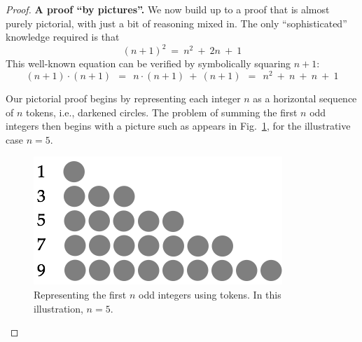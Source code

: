 \begin{proof}
{\bf A proof ``by pictures''.}
%
We now build up to a proof that is almost purely pictorial, with just
a bit of reasoning mixed in.  The only ``sophisticated'' knowledge
required is that
\begin{equation}
\label{eq:(n+1)^2}
(n+1)^2 \ = \ n^2 \ + \ 2n \ + \ 1
\end{equation}
This well-known equation can be verified by symbolically squaring $n+1$:
\[ (n+1) \cdot (n+1) \ \ = \ \ n \cdot (n+1) \ + \ (n+1) 
     \ \ = \ \ n^2 \ + \ n \ + \ n \ + \ 1
\]

\medskip

\noindent {}

\bigskip

\noindent
%
Our pictorial proof begins by representing each integer $n$ as a
horizontal sequence of $n$ tokens, i.e., darkened circles.  The
problem of summing the first $n$ odd integers then begins with a
picture such as appears in Fig.~\ref{fig:sumOdds1}, for the
illustrative case $n=5$.
\begin{figure}[ht]
\begin{center}
       \includegraphics[scale=0.4]{FiguresMaths/SumOddsBasis}
\caption{Representing the first $n$ odd integers using tokens.  In
  this illustration, $n=5$.}
       \label{fig:sumOdds1}
\end{center}
\end{figure}


\end{proof}
